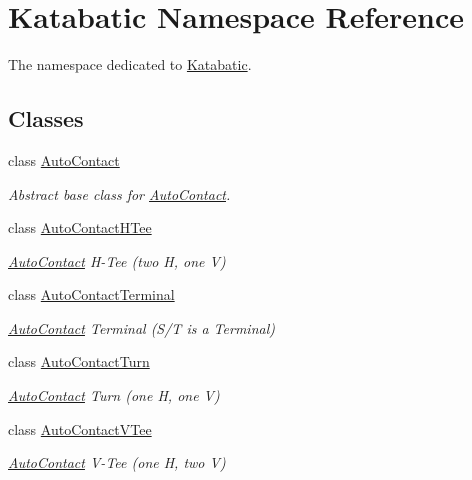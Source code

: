 \hypertarget{namespaceKatabatic}{}\section{Katabatic Namespace Reference}
\label{namespaceKatabatic}


The namespace dedicated to \mbox{\hyperlink{namespaceKatabatic}{Katabatic}}.  


\subsection*{Classes}
\begin{DoxyCompactItemize}
\item 
class \mbox{\hyperlink{classKatabatic_1_1AutoContact}{Auto\+Contact}}
\begin{DoxyCompactList}\small\item\em Abstract base class for \mbox{\hyperlink{classKatabatic_1_1AutoContact}{Auto\+Contact}}. \end{DoxyCompactList}\item 
class \mbox{\hyperlink{classKatabatic_1_1AutoContactHTee}{Auto\+Contact\+H\+Tee}}
\begin{DoxyCompactList}\small\item\em \mbox{\hyperlink{classKatabatic_1_1AutoContact}{Auto\+Contact}} H-\/\+Tee (two H, one V) \end{DoxyCompactList}\item 
class \mbox{\hyperlink{classKatabatic_1_1AutoContactTerminal}{Auto\+Contact\+Terminal}}
\begin{DoxyCompactList}\small\item\em \mbox{\hyperlink{classKatabatic_1_1AutoContact}{Auto\+Contact}} Terminal (S/T is a Terminal) \end{DoxyCompactList}\item 
class \mbox{\hyperlink{classKatabatic_1_1AutoContactTurn}{Auto\+Contact\+Turn}}
\begin{DoxyCompactList}\small\item\em \mbox{\hyperlink{classKatabatic_1_1AutoContact}{Auto\+Contact}} Turn (one H, one V) \end{DoxyCompactList}\item 
class \mbox{\hyperlink{classKatabatic_1_1AutoContactVTee}{Auto\+Contact\+V\+Tee}}
\begin{DoxyCompactList}\small\item\em \mbox{\hyperlink{classKatabatic_1_1AutoContact}{Auto\+Contact}} V-\/\+Tee (one H, two V) \end{DoxyCompactList}\item 

\end{DoxyCompactItemize}

